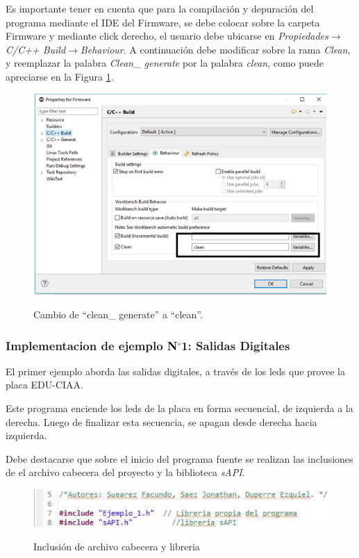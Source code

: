 \documentclass[12pt,letterpaper]{article}
\begin{document}
Es importante tener en cuenta que para la compilación y depuración del programa mediante el IDE del Firmware, se debe colocar sobre la carpeta Firmware y mediante click derecho, el usuario debe ubicarse en \textit{Propiedades}$\rightarrow$\textit{C/C++ Build}$\rightarrow$\textit{Behaviour}. A continuación debe modificar sobre la rama \textit{Clean}, y reemplazar la palabra \textit{Clean\_ generate} por la palabra \textit{clean}, como puede apreciarse en la Figura \ref{Fig19}.
\begin{center}
\begin{figure}[!h]
\centering
\includegraphics[width=8 cm]{figuras/f1.png}\\
\caption{Cambio de “clean\_ generate” a “clean”.}
\label{Fig19}
\end{figure}
\end{center} 
\subsubsection{Implementacion de ejemplo N$^{\circ}$1: Salidas Digitales}
El primer ejemplo aborda las salidas digitales, a través de los leds que provee la placa EDU-CIAA.

Este programa enciende los leds de la placa en forma secuencial, de izquierda a la derecha. Luego de finalizar esta secuencia, se apagan desde derecha hacia izquierda.

Debe destacarse que sobre el inicio del programa fuente se realizan las inclusiones de el archivo cabecera del proyecto y la biblioteca \textit{sAPI}.

\begin{center}
\begin{figure}[!h]
\centering
\includegraphics[width=6 cm]{figuras/f2.png}\\
\caption{Inclusión de archivo cabecera y libreria}
\label{Fig20}
\end{figure}
\end{center}
	
\end{document}
